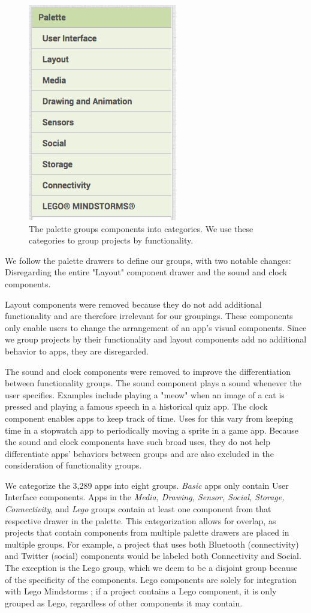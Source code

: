 \documentclass[conference]{IEEEtran}
\begin{document}
\begin{figure}[h!]
	\centering
	\includegraphics[width=0.4\linewidth]{palette.png}
	\caption{The palette groups components into categories. We use these categories to group projects by functionality.}
	\label{palette}
\end{figure}

We follow the palette drawers to define our groups, with two notable changes: Disregarding the entire "Layout" component drawer and the sound and clock components. 

Layout components were removed because they do not add additional functionality and are therefore irrelevant for our groupings. These components only enable users to change the arrangement of an app's visual components. Since we group projects by their functionality and layout components add no additional behavior to apps, they are disregarded.

The sound and clock components were removed to improve the differentiation between functionality groups. The sound component plays a sound whenever the user specifies. Examples include playing a "meow" when an image of a cat is pressed and playing a famous speech in a historical quiz app. The clock component enables apps to keep track of time. Uses for this vary from keeping time in a stopwatch app to periodically moving a sprite in a game app. Because the sound and clock components have such broad uses, they do not help differentiate apps' behaviors between groups and are also excluded in the consideration of functionality groups.

We categorize the 3,289 apps into eight groups. \emph{Basic} apps only contain User Interface components. Apps in the \emph{Media, Drawing, Sensor, Social, Storage, Connectivity}, and \emph{Lego} groups contain at least one component from that respective drawer in the palette. This categorization allows for overlap, as projects that contain components from multiple palette drawers are placed in multiple groups. For example, a project that uses both Bluetooth (connectivity) and Twitter (social) components would be labeled both Connectivity and Social. The exception is the Lego group, which we deem to be a disjoint group because of the specificity of the components. Lego components are solely for integration with Lego Mindstorms \cite{lego}; if a project contains a Lego component, it is only grouped as Lego, regardless of other components it may contain. 
\end{document}
